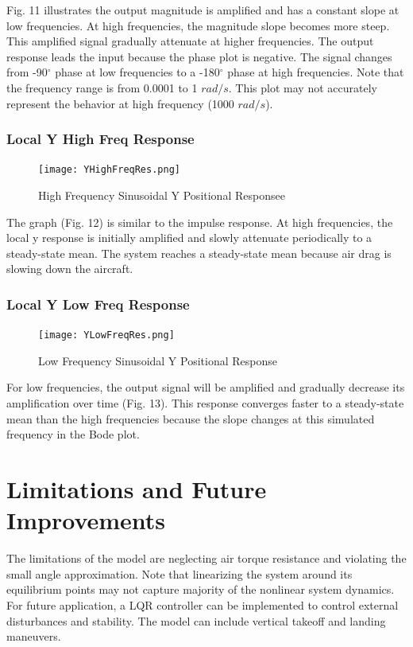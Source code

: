\documentclass[conference]{IEEEtran}
\begin{document}
Fig. 11 illustrates the output magnitude is amplified and has a constant slope at low frequencies. At high frequencies, the magnitude slope becomes more steep. This amplified signal gradually attenuate at higher frequencies. The output response leads the input because the phase plot is negative. The signal changes from -90$^{\circ}$ phase at low frequencies to a -180$^{\circ}$ phase at high frequencies.
Note that the frequency range is from 0.0001 to 1 $rad/s$. This plot may not accurately represent the behavior at high frequency (1000 $rad/s$).
\subsubsection{Local Y High Freq Response} 
\begin{figure}[htbp]
\centering
\centerline{\texttt{[image: YHighFreqRes.png]}}
\caption{High Frequency Sinusoidal Y  Positional Responsee}
\label{figure}
\end{figure}

The graph (Fig. 12) is similar to the impulse response. At high frequencies, the local y response is initially amplified and slowly attenuate periodically to a steady-state mean. The system reaches a steady-state mean because air drag is slowing down the aircraft. \\

\newpage
\subsubsection{Local Y Low Freq Response} 
\begin{figure}[htbp]
\centerline{\texttt{[image: YLowFreqRes.png]}}
\caption{Low Frequency Sinusoidal Y Positional Response}
\label{figure}
\end{figure}

For low frequencies, the output signal will be amplified and gradually decrease its amplification over time (Fig. 13).  This response converges faster to a steady-state mean than the high frequencies because the slope changes at this simulated frequency in the Bode plot. \\


\section{Limitations and Future Improvements}
The limitations of the model are neglecting air torque resistance and violating the small angle approximation. Note that linearizing the system around its equilibrium points may not capture majority of the nonlinear system dynamics. For future application, a LQR controller can be implemented to control external disturbances and stability. The model can include vertical takeoff and landing maneuvers.
\end{document}
